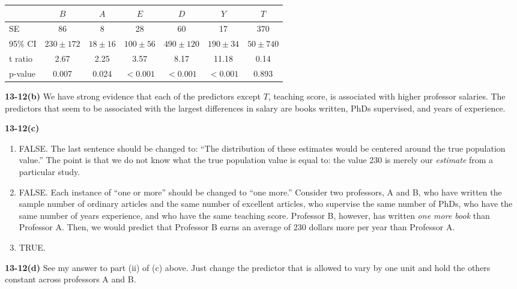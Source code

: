 \documentclass[addpoints,12pt]{exam}\usepackage[]{graphicx}\usepackage[]{color}
\begin{document}
\begin{questions}
\begin{parts}
\begin{solution}
\begin{center}
  \begin{tabular}{lcccccc}
  &$B$ & $A$ & $E$& $D$ & $Y$& $T$\\
  \hline
  SE & 86 & 8 & 28 & 60 & 17 & 370\\
  95\% CI & $230 \pm 172$ & $18 \pm 16$ & $100 \pm 56$ & $490 \pm 120$ & $190 \pm 34$ & $50 \pm 740$ \\ 
  t ratio & 2.67&  2.25&  3.57  &8.17 &11.18 &0.14\\
  p-value &0.007& 0.024& $<0.001$& $<0.001$& $<0.001$& 0.893
  \end{tabular}
  \end{center}
  \end{solution}
  \item[]
  \begin{solution} \textbf{13-12(b)}
  We have strong evidence that each of the predictors except $T$, teaching score, is associated with higher professor salaries. The predictors that seem to be associated with the largest differences in salary are books written, PhDs supervised, and years of experience.
  \end{solution}
  \item[]
  \begin{solution} \textbf{13-12(c)}
  \begin{enumerate}
  \item FALSE. The last sentence should be changed to: ``The distribution of these estimates would be centered around the true population value.'' The point is that we do not know what the true population value is equal to: the value 230 is merely our \emph{estimate} from a particular study.
  \item FALSE. Each instance of ``one or more'' should be changed to ``one more.'' Consider two professors, A and B, who have written the sample number of ordinary articles and the same number of excellent articles, who supervise the same number of PhDs, who have the same number of years experience, and who have the same teaching score. Professor B, however, has written \emph{one more book} than Professor A. Then, we would predict that Professor B earns an average of 230 dollars more per year than Professor A.
  \item TRUE.
  \end{enumerate}
  \end{solution}
  \item[]
  \begin{solution} \textbf{13-12(d)}
  See my answer to part (ii) of (c) above. Just change the predictor that is allowed to vary by one unit and hold the others constant across professors A and B.\end{solution}
  \end{parts}
  \end{questions}
  
\end{document}
